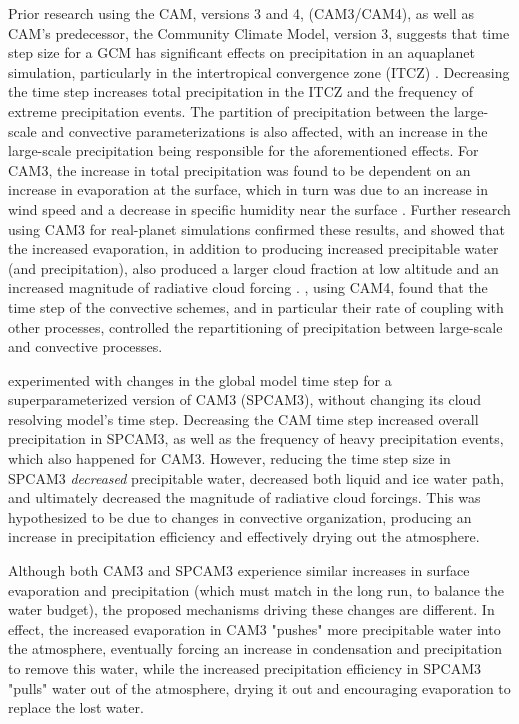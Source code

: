 \documentclass [11pt, proquest] {uwthesis}[2020/02/24]
\begin{document}
Prior research using the CAM, versions 3 and 4, (CAM3/CAM4), as well as CAM's predecessor, the Community Climate Model, version 3, suggests that time step size for a GCM has significant effects on precipitation in an aquaplanet simulation, particularly in the intertropical convergence zone (ITCZ) \parencite{Williamson2003, Williamson2008, Mishra2008}. Decreasing the time step increases total precipitation in the ITCZ and the frequency of extreme precipitation events. The partition of precipitation between the large-scale and convective parameterizations is also affected, with an increase in the large-scale precipitation being responsible for the aforementioned effects. For CAM3, the increase in total precipitation was found to be dependent on an increase in evaporation at the surface, which in turn was due to an increase in wind speed and a decrease in specific humidity near the surface \parencite{Mishra2008}. Further research using CAM3 for real-planet simulations confirmed these results, and showed that the increased evaporation, in addition to producing increased precipitable water (and precipitation), also produced a larger cloud fraction at low altitude and an increased magnitude of radiative cloud forcing \parencite{Mishra2011}. \textcite{Williamson2013}, using CAM4, found that the time step of the convective schemes, and in particular their rate of coupling with other processes, controlled the repartitioning of precipitation between large-scale and convective processes.

\textcite{Yu2015} experimented with changes in the global model time step for a superparameterized version of CAM3 (SPCAM3), without changing its cloud resolving model's time step. Decreasing the CAM time step increased overall precipitation in SPCAM3, as well as the frequency of heavy precipitation events, which also happened for CAM3. However, reducing the time step size in SPCAM3 \emph{decreased} precipitable water, decreased both liquid and ice water path, and ultimately decreased the magnitude of radiative cloud forcings. This was hypothesized to be due to changes in convective organization, producing an increase in precipitation efficiency and effectively drying out the atmosphere.

Although both CAM3 and SPCAM3 experience similar increases in surface evaporation and precipitation (which must match in the long run, to balance the water budget), the proposed mechanisms driving these changes are different. In effect, the increased evaporation in CAM3 "pushes" more precipitable water into the atmosphere, eventually forcing an increase in condensation and precipitation to remove this water, while the increased precipitation efficiency in SPCAM3 "pulls" water out of the atmosphere, drying it out and encouraging evaporation to replace the lost water.
\end{document}
